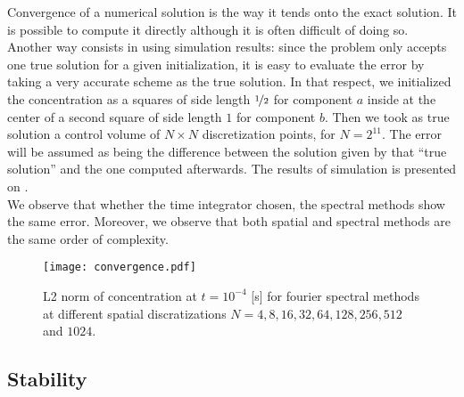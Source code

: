 \documentclass[10pt,a4paper,twocolumn]{article}
\begin{document}
Convergence of a numerical solution is the way it tends onto the exact solution. It is possible to compute it directly although it is often difficult of doing so. Another way consists in using simulation results: since the problem only accepts one true solution for a given initialization, it is easy to evaluate the error by taking a very accurate scheme as the true solution. In that respect, we initialized the concentration as a squares of side length $\nicefrac{1}{2}$ for component $a$ inside at the center of a second square of side length $1$ for component $b$. Then we took as true solution a control volume of $N\times N$ discretization points, for $N=2^{11}$. The error will be assumed as being the difference between the solution given by that ``true solution'' and the one computed afterwards. The results of simulation is presented on .
\vspace{\baselineskip}\\
We observe that whether the time integrator chosen, the spectral methods show the same error. Moreover, we observe that both spatial and spectral methods are the same order of complexity.
\begin{figure}
	\centering
	\texttt{[image: convergence.pdf]}
	\caption{L2 norm of concentration at $t = 10^{-4}$ [s] for fourier spectral methods at different spatial discratizations $N = 4,8,16,32,64,128,256,512$ and $1024$.}
	\label{fig:convergence}
\end{figure}

\subsection{Stability} %
\label{sub:stability}
\end{document}
